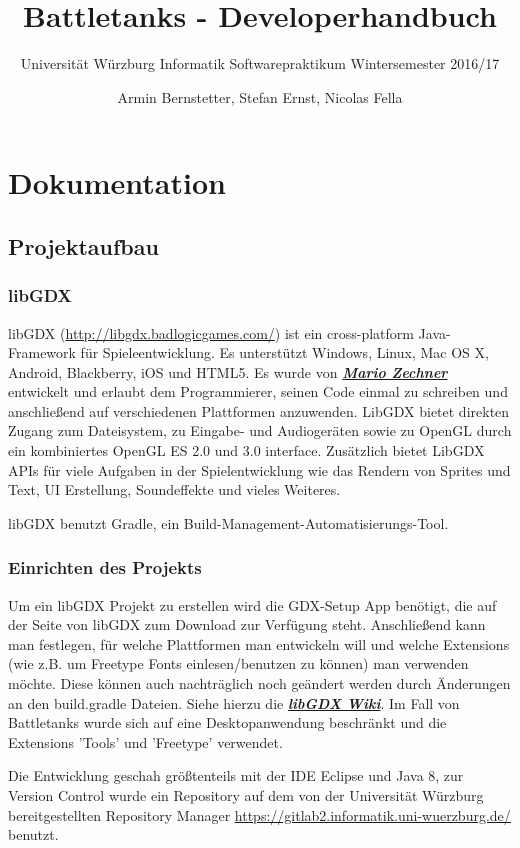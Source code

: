 \documentclass[a4paper]{scrreprt}
\title{Battletanks - Developerhandbuch}
\subtitle{Universität Würzburg Informatik Softwarepraktikum Wintersemester 2016/17}
\author{Armin Bernstetter, Stefan Ernst, Nicolas Fella}
\begin{document}
\maketitle
\tableofcontents
\newpage



\chapter{Dokumentation}
\section{Projektaufbau}
\subsection{libGDX}
libGDX (\url{http://libgdx.badlogicgames.com/}) ist ein cross-platform Java-Framework für Spieleentwicklung. Es unterstützt Windows, Linux, Mac OS X, Android, Blackberry, iOS und HTML5.
Es wurde von \href{https://twitter.com/badlogicgames}{\textbf{\textit{Mario Zechner}}} entwickelt und erlaubt dem Programmierer, seinen Code einmal zu schreiben und anschließend auf verschiedenen Plattformen anzuwenden.
LibGDX bietet direkten Zugang zum Dateisystem, zu Eingabe- und Audiogeräten sowie zu OpenGL durch ein kombiniertes OpenGL ES 2.0 und 3.0 interface.
Zusätzlich bietet LibGDX APIs für viele Aufgaben in der Spielentwicklung wie das Rendern von Sprites und Text, UI Erstellung, Soundeffekte und vieles Weiteres.

libGDX benutzt Gradle, ein Build-Management-Automatisierungs-Tool.


\subsection{Einrichten des Projekts}
Um ein libGDX Projekt zu erstellen wird die GDX-Setup App benötigt, die auf der Seite von libGDX zum Download zur Verfügung steht. Anschließend kann man festlegen, für welche Plattformen man entwickeln will und welche Extensions (wie z.B. um Freetype Fonts einlesen/benutzen zu können) man verwenden möchte. Diese können auch nachträglich noch geändert werden durch Änderungen an den build.gradle Dateien. Siehe hierzu die \href{https://github.com/libgdx/libgdx/wiki}{\textbf{\textit{libGDX Wiki}}}.
Im Fall von Battletanks wurde sich auf eine Desktopanwendung beschränkt und die Extensions 'Tools' und 'Freetype' verwendet.

Die Entwicklung geschah größtenteils mit der IDE Eclipse und Java 8, zur Version Control wurde ein Repository auf dem von der Universität Würzburg bereitgestellten Repository Manager \url{https://gitlab2.informatik.uni-wuerzburg.de/} benutzt.
\end{document}
